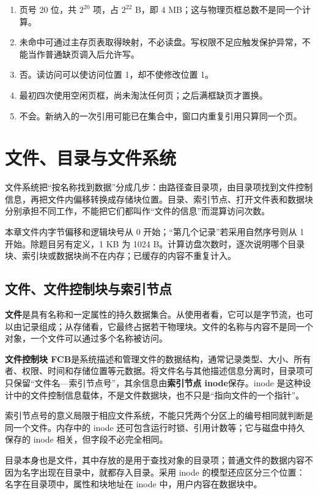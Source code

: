 \begin{enumerate}
\def\labelenumi{\arabic{enumi}.}
\tightlist
\item
  页号 20 位，共 \(2^{20}\) 项，占 \(2^{22}\) B，即 4 MB；这与物理页框总数不是同一个计算。
\item
  未命中可通过主存页表取得映射，不必读盘。写权限不足应触发保护异常，不能当作普通缺页调入后允许写。
\item
  否。读访问可以使访问位置 1，却不使修改位置 1。
\item
  最初四次使用空闲页框，尚未淘汰任何页；之后满框缺页才置换。
\item
  不会。新纳入的一次引用可能已在集合中，窗口内重复引用只算同一个页。
\end{enumerate}

\chapter{文件、目录与文件系统}\label{os-ch6}

文件系统把``按名称找到数据''分成几步：由路径查目录项，由目录项找到文件控制信息，再把文件内偏移转换成存储块位置。目录、索引节点、打开文件表和数据块分别承担不同工作，不能把它们都叫作``文件的信息''而混算访问次数。

本章文件内字节偏移和逻辑块号从 0 开始；``第几个记录''若采用自然序号则从 1 开始。除题目另有定义，1 KB 为 1024 B。计算访盘次数时，逐次说明哪个目录块、索引块或数据块尚不在内存；已缓存的内容不重复计入。

\section{文件、文件控制块与索引节点}\label{os-6-1}

\textbf{文件}是具有名称和一定属性的持久数据集合。从使用者看，它可以是字节流，也可以由记录组成；从存储看，它最终占据若干物理块。文件的名称与内容不是同一个对象，一个文件可以通过多个名称被访问。

\textbf{文件控制块 FCB}是系统描述和管理文件的数据结构，通常记录类型、大小、所有者、权限、时间和存储位置等元数据。将文件名与其他描述信息分离时，目录项可只保留``文件名---索引节点号''，其余信息由\textbf{索引节点 inode}保存。inode 是这种设计中的文件控制信息载体，不是文件数据块，也不只是``指向文件的一个指针''。

索引节点号的意义局限于相应文件系统，不能只凭两个分区上的编号相同就判断是同一个文件。内存中的 inode 还可包含运行时锁、引用计数等；它与磁盘中持久保存的 inode 相关，但字段不必完全相同。

目录本身也是文件，其中存放的是用于查找对象的目录项；普通文件的数据内容不因为名字出现在目录中，就都存入目录。采用 inode 的模型还应区分三个位置：名字在目录项中，属性和块地址在 inode 中，用户内容在数据块中。

